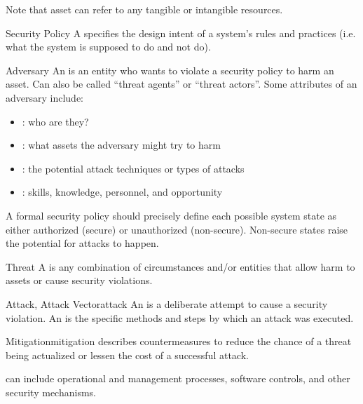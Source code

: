 Note that asset can refer to any tangible or intangible resources.

\begin{dfnbox}{Security Policy}{}
    A  specifies the design intent of a system's rules and practices (i.e. what the system is supposed to do and not do).
\end{dfnbox}

\begin{dfnbox}{Adversary}{}
    An  is an entity who wants to violate a security policy to harm an asset. Can also be called ``threat agents'' or ``threat actors''. Some attributes of an adversary include:
    \begin{itemize}[noitemsep]
        \item {}: who are they?
        \item {}: what assets the adversary might try to harm
        \item {}: the potential attack techniques or types of attacks
        \item {}: skills, knowledge, personnel, and opportunity
    \end{itemize}
\end{dfnbox}

A formal security policy should precisely define each possible system state as either authorized (secure) or unauthorized (non-secure). Non-secure states raise the potential for attacks to happen.

\begin{dfnbox}{Threat}{}
    A  is any combination of circumstances and/or entities that allow harm to assets or cause security violations.
\end{dfnbox}

\begin{dfnbox}{Attack, Attack Vector}{attack}
    An  is a deliberate attempt to cause a security violation. An  is the specific methods and steps by which an attack was executed.

\end{dfnbox}

\begin{dfnbox}{Mitigation}{mitigation}
     describes countermeasures to reduce the chance of a threat being actualized or lessen the cost of a successful attack.
\end{dfnbox}

 can include operational and management processes, software controls, and other security mechanisms.

